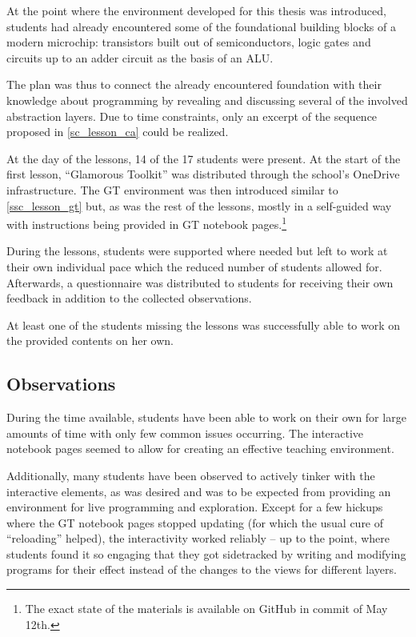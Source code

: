 At the point where the environment developed for this thesis was introduced, students had already encountered some of the foundational building blocks of a modern microchip: transistors built out of semiconductors, logic gates and circuits up to an adder circuit as the basis of an ALU.

The plan was thus to connect the already encountered foundation with their knowledge about programming by revealing and discussing several of the involved abstraction layers. Due to time constraints, only an excerpt of the sequence proposed in \ref{sc_lesson_ca} could be realized.

At the day of the lessons, 14 of the 17 students were present. At the start of the first lesson, ``Glamorous Toolkit'' was distributed through the school's OneDrive infrastructure. The GT environment was then introduced similar to \ref{ssc_lesson_gt} but, as was the rest of the lessons, mostly in a self-guided way with instructions being provided in GT notebook pages.\footnote{The exact state of the materials is available on GitHub \cite{Bue25a} in commit  of May 12th.}

During the lessons, students were supported where needed but left to work at their own individual pace which the reduced number of students allowed for. Afterwards, a questionnaire was distributed to students for receiving their own feedback in addition to the collected observations.

At least one of the students missing the lessons was successfully able to work on the provided contents on her own.


\subsection{Observations}

During the time available, students have been able to work on their own for large amounts of time with only few common issues occurring. The interactive notebook pages seemed to allow for creating an effective teaching environment.

Additionally, many students have been observed to actively tinker with the interactive elements, as was desired and was to be expected from providing an environment for live programming and exploration. Except for a few hickups where the GT notebook pages stopped updating (for which the usual cure of ``reloading'' helped), the interactivity worked reliably -- up to the point, where students found it so engaging that they got sidetracked by writing and modifying programs for their effect instead of the changes to the views for different layers.

